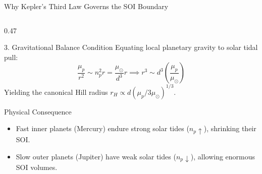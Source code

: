\documentclass[aspectratio=169, 10pt]{beamer}
\begin{document}
\begin{frame}{Why Kepler's Third Law Governs the SOI Boundary}
\begin{columns}[t]
        \begin{column}{0.47\textwidth}
            \begin{alertblock}{3. Gravitational Balance Condition}
                \scriptsize
                Equating local planetary gravity to solar tidal pull:
                \vspace{-0.1cm}
                \begin{equation*}
                    \frac{\mu_p}{r^2} \sim n_p^2 r = \frac{\mu_\odot}{d^3} r \implies r^3 \sim d^3 \left(\frac{\mu_p}{\mu_\odot}\right)
                \end{equation*}
                \vspace{-0.05cm}
                Yielding the canonical Hill radius $r_H \propto d (\mu_p / 3\mu_\odot)^{1/3}$.
            \end{alertblock}
            \vspace{-0.1cm}
            \begin{exampleblock}{Physical Consequence}
                \scriptsize
                \begin{itemize}\setlength{\itemsep}{1pt}
                    \item Fast inner planets (Mercury) endure strong solar tides ($n_p \uparrow$), shrinking their SOI.
                    \item Slow outer planets (Jupiter) have weak solar tides ($n_p \downarrow$), allowing enormous SOI volumes.
                \end{itemize}
            \end{exampleblock}
        \end{column}
    \end{columns}
\end{frame}
\end{document}
